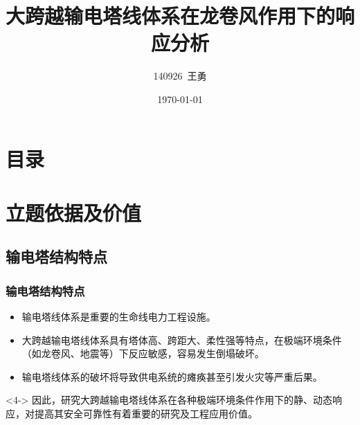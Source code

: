 \documentclass[]{beamer}
\title{大跨越输电塔线体系在龙卷风作用下的响应分析}
\author{140926~王勇}
\institute{东南大学}
\date{\today}
\begin{document}
\begin{frame}
	\titlepage
\end{frame}

\section*{目录}
\begin{frame}
  \tableofcontents
\end{frame}

\section{立题依据及价值}
\subsection{输电塔结构特点}
\begin{frame}
  \frametitle{输电塔结构特点}
  \begin{itemize}
  	\item<1-> 输电塔线体系是重要的生命线电力工程设施。
  	\item<2-> 大跨越输电塔线体系具有塔体高、跨距大、柔性强等特点，在极端环境条件（如龙卷风、地震等）下反应敏感，容易发生倒塌破坏。
  	\item<3-> 输电塔线体系的破坏将导致供电系统的瘫痪甚至引发火灾等严重后果。
  \end{itemize}
  
  \begin{block}<4-> {因此，研究大跨越输电塔线体系在各种极端环境条件作用下的静、动态响应，对提高其安全可靠性有着重要的研究及工程应用价值。}
  \end{block}
\end{frame}
\end{document}
